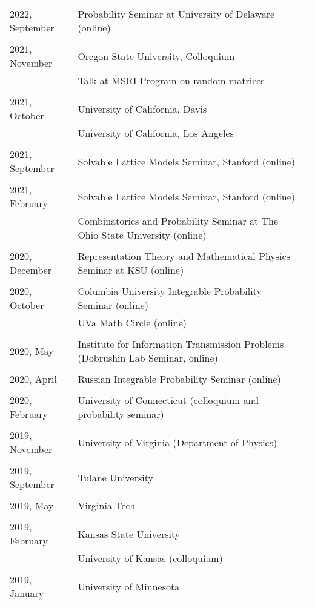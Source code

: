 \documentclass[letterpaper,11pt]{article}
\begin{document}
\begin{longtable}{llc}
	2022, September
	& Probability Seminar at University of Delaware (online)
	\\\\
	2021, November
	& Oregon State University, Colloquium
	\\
	& Talk at MSRI Program on random matrices
	\\\\
	2021, October
	& University of California, Davis
	\\
	& University of California, Los Angeles
	\\\\
	2021, September
	& Solvable Lattice Models Seminar, Stanford (online)
	\\\\
	2021, February
	& Solvable Lattice Models Seminar, Stanford (online)
	\\
	&
	Combinatorics and Probability Seminar at The Ohio State University (online)
	\\\\
	2020, December
	& Representation Theory and Mathematical Physics Seminar at KSU (online)
	\\\\
	2020, October
	& Columbia University Integrable Probability Seminar (online)
	\\
	&
	UVa Math Circle (online)
	\\\\
	2020, May
	& Institute for Information Transmission Problems
	(Dobrushin Lab Seminar, online)
	\\\\
	2020, April
	& Russian Integrable Probability Seminar (online)
	\\\\
	2020, February
	& University of Connecticut (colloquium and probability seminar)
	\\\\
	2019, November
	& University of Virginia (Department of Physics)
	\\\\
	2019, September
	& Tulane University
	\\\\
	2019, May
	& Virginia Tech
	\\\\
	2019, February
	& Kansas State University \\
	& University of Kansas (colloquium)
	\\\\
	2019, January
	& University of Minnesota

\end{longtable}
\end{document}
